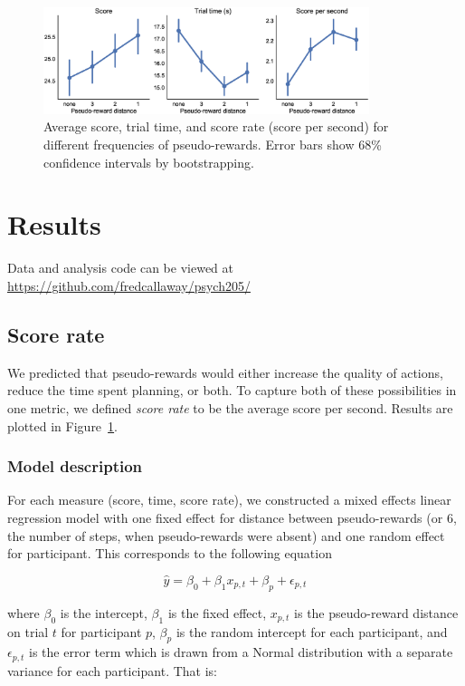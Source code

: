 \documentclass[10pt,letterpaper]{article}
\begin{document}
\begin{figure}[t!]
    \centering
    \includegraphics[width=0.85\textwidth]{figs/basic.eps}
    \caption{Average score, trial time, and score rate (score per second) for different frequencies of pseudo-rewards. Error bars show 68\% confidence intervals by bootstrapping.}
    \label{fig:basic}
\end{figure}

\section{Results}\label{results}

Data and analysis code can be viewed at \url{https://github.com/fredcallaway/psych205/}

\subsection{Score rate}
We predicted that pseudo-rewards would either increase the quality of actions, reduce the time spent planning, or both. To capture both of these possibilities in one metric, we defined \emph{score rate} to be the average score per second. Results are plotted in Figure~\ref{fig:basic}.

\subsubsection{Model description}
For each measure (score, time, score rate), we constructed a mixed effects linear regression model with one fixed effect for distance between pseudo-rewards (or 6, the number of steps, when pseudo-rewards were absent) and one random effect for participant. This corresponds to the following equation

\begin{equation}
    \hat{y} = \beta_0 + \beta_1 x_{p,t} + \beta_p + \epsilon_{p,t}
\end{equation}

where $\beta_0$ is the intercept, $\beta_1$ is the fixed effect, $x_{p,t}$ is the pseudo-reward distance on trial $t$ for participant $p$, $\beta_p$ is the random intercept for each participant, and $\epsilon_{p,t}$ is the error term which is drawn from a Normal distribution with a separate variance for each participant. That is:
\end{document}
